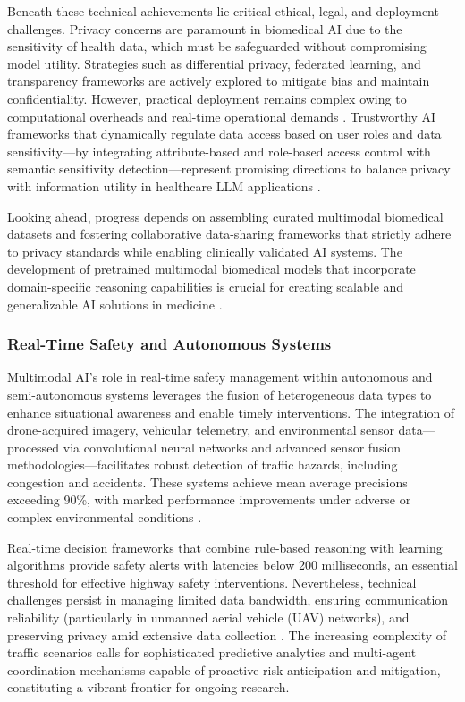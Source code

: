 \documentclass[sigconf]{acmart}
\begin{document}
Beneath these technical achievements lie critical ethical, legal, and deployment challenges. Privacy concerns are paramount in biomedical AI due to the sensitivity of health data, which must be safeguarded without compromising model utility. Strategies such as differential privacy, federated learning, and transparency frameworks are actively explored to mitigate bias and maintain confidentiality. However, practical deployment remains complex owing to computational overheads and real-time operational demands \cite{ref11,ref12}. Trustworthy AI frameworks that dynamically regulate data access based on user roles and data sensitivity—by integrating attribute-based and role-based access control with semantic sensitivity detection—represent promising directions to balance privacy with information utility in healthcare LLM applications \cite{ref11}.

Looking ahead, progress depends on assembling curated multimodal biomedical datasets and fostering collaborative data-sharing frameworks that strictly adhere to privacy standards while enabling clinically validated AI systems. The development of pretrained multimodal biomedical models that incorporate domain-specific reasoning capabilities is crucial for creating scalable and generalizable AI solutions in medicine \cite{ref12}.

\subsubsection{Real-Time Safety and Autonomous Systems}

Multimodal AI’s role in real-time safety management within autonomous and semi-autonomous systems leverages the fusion of heterogeneous data types to enhance situational awareness and enable timely interventions. The integration of drone-acquired imagery, vehicular telemetry, and environmental sensor data—processed via convolutional neural networks and advanced sensor fusion methodologies—facilitates robust detection of traffic hazards, including congestion and accidents. These systems achieve mean average precisions exceeding 90\%, with marked performance improvements under adverse or complex environmental conditions \cite{ref27}.

Real-time decision frameworks that combine rule-based reasoning with learning algorithms provide safety alerts with latencies below 200 milliseconds, an essential threshold for effective highway safety interventions. Nevertheless, technical challenges persist in managing limited data bandwidth, ensuring communication reliability (particularly in unmanned aerial vehicle (UAV) networks), and preserving privacy amid extensive data collection \cite{ref27}. The increasing complexity of traffic scenarios calls for sophisticated predictive analytics and multi-agent coordination mechanisms capable of proactive risk anticipation and mitigation, constituting a vibrant frontier for ongoing research.
\end{document}
